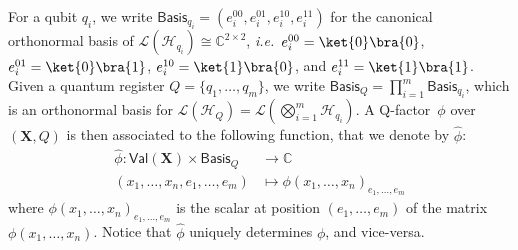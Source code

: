 \documentclass[10pt,a4paper]{article}
\newcommand*{\ie}{\emph{i.e.}\xspace}
\newcommand*{\setofrv}[1]{\mathsf{Val}(#1)}
\newcommand{\bX}{\mathbf X}
\renewcommand{\L}{\mathcal{L}}
\newcommand*{\baseof}[1]{\textsf{Basis}_{#1}}
\newcommand*{\C}{\mathbb{C}}
\newcommand{\HH}{\mathcal{H}}
\newcommand{\qfactfunc}[1]{\widehat{#1}}
\newcommand{\reg}{Q}
\newcommand{\qreg}{\reg}
\newcommand*{\someqfact}{\phi}
\newcommand*{\qfactor}{Q-factor}
\begin{document}
For a qubit $q_i$, we write $\baseof{q_i} = (e^{00}_i,e^{01}_i,e^{10}_i,e^{11}_i)$ for the canonical orthonormal basis of $\L(\HH_{q_i}) \cong \C^{2\times 2}$, \ie\ $e^{00}_i = \ket{0}\bra{0}$, $e^{01}_i = \ket{0}\bra{1}$, $e^{10}_i = \ket{1}\bra{0}$, and $e^{11}_i = \ket{1}\bra{1}$.
Given a quantum register $\qreg = \{q_1, \dots, q_m\}$, we write $\baseof{\qreg} = \prod_{i=1}^m\baseof{q_i}$, which is an orthonormal basis for $\L(\HH_\qreg) = \L(\bigotimes_{i=1}^m \HH_{q_i})$.
A \qfactor\ $\someqfact$ over $(\bX,\qreg)$ is then associated to the following function, that we denote by $\qfactfunc{\someqfact}$:
\begin{align*}
\qfactfunc{\someqfact}: \setofrv{\bX} \times \baseof{\qreg} &\to \C\\
(x_1,\dots,x_n,e_1,\dots,e_m)&\mapsto \someqfact(x_1,\dots,x_n)_{e_1,\dots,e_m}
\end{align*}
where $\someqfact(x_1,\dots,x_n)_{e_1,\dots,e_m}$ is the scalar at position $(e_1,\dots,e_m)$ of the matrix $\someqfact(x_1,\dots,x_n)$.
Notice that $\qfactfunc{\someqfact}$ uniquely determines $\someqfact$, and vice-versa.
\end{document}
